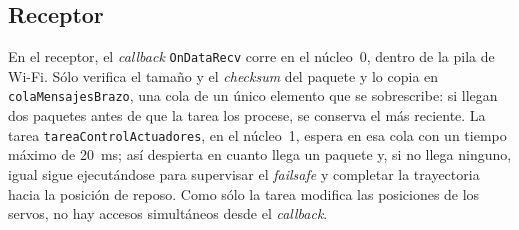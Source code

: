 \subsection{Receptor}

En el receptor, el \emph{callback} \texttt{OnDataRecv} corre en el núcleo~0, dentro de la pila de Wi-Fi. Sólo verifica el tamaño y el \emph{checksum} del paquete y lo copia en \texttt{colaMensajesBrazo}, una cola de un único elemento que se sobrescribe: si llegan dos paquetes antes de que la tarea los procese, se conserva el más reciente. La tarea \texttt{tareaControlActuadores}, en el núcleo~1, espera en esa cola con un tiempo máximo de \SI{20}{ms}; así despierta en cuanto llega un paquete y, si no llega ninguno, igual sigue ejecutándose para supervisar el \emph{failsafe} y completar la trayectoria hacia la posición de reposo. Como sólo la tarea modifica las posiciones de los servos, no hay accesos simultáneos desde el \emph{callback}.

